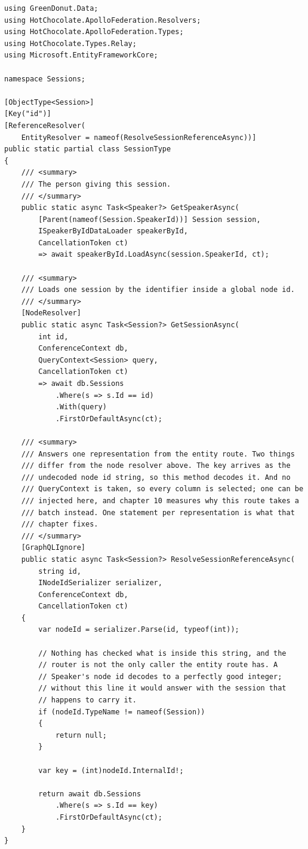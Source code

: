 \begin{verbatim}
using GreenDonut.Data;
using HotChocolate.ApolloFederation.Resolvers;
using HotChocolate.ApolloFederation.Types;
using HotChocolate.Types.Relay;
using Microsoft.EntityFrameworkCore;

namespace Sessions;

[ObjectType<Session>]
[Key("id")]
[ReferenceResolver(
    EntityResolver = nameof(ResolveSessionReferenceAsync))]
public static partial class SessionType
{
    /// <summary>
    /// The person giving this session.
    /// </summary>
    public static async Task<Speaker?> GetSpeakerAsync(
        [Parent(nameof(Session.SpeakerId))] Session session,
        ISpeakerByIdDataLoader speakerById,
        CancellationToken ct)
        => await speakerById.LoadAsync(session.SpeakerId, ct);

    /// <summary>
    /// Loads one session by the identifier inside a global node id.
    /// </summary>
    [NodeResolver]
    public static async Task<Session?> GetSessionAsync(
        int id,
        ConferenceContext db,
        QueryContext<Session> query,
        CancellationToken ct)
        => await db.Sessions
            .Where(s => s.Id == id)
            .With(query)
            .FirstOrDefaultAsync(ct);

    /// <summary>
    /// Answers one representation from the entity route. Two things
    /// differ from the node resolver above. The key arrives as the
    /// undecoded node id string, so this method decodes it. And no
    /// QueryContext is taken, so every column is selected; one can be
    /// injected here, and chapter 10 measures why this route takes a
    /// batch instead. One statement per representation is what that
    /// chapter fixes.
    /// </summary>
    [GraphQLIgnore]
    public static async Task<Session?> ResolveSessionReferenceAsync(
        string id,
        INodeIdSerializer serializer,
        ConferenceContext db,
        CancellationToken ct)
    {
        var nodeId = serializer.Parse(id, typeof(int));

        // Nothing has checked what is inside this string, and the
        // router is not the only caller the entity route has. A
        // Speaker's node id decodes to a perfectly good integer;
        // without this line it would answer with the session that
        // happens to carry it.
        if (nodeId.TypeName != nameof(Session))
        {
            return null;
        }

        var key = (int)nodeId.InternalId!;

        return await db.Sessions
            .Where(s => s.Id == key)
            .FirstOrDefaultAsync(ct);
    }
}
\end{verbatim}

